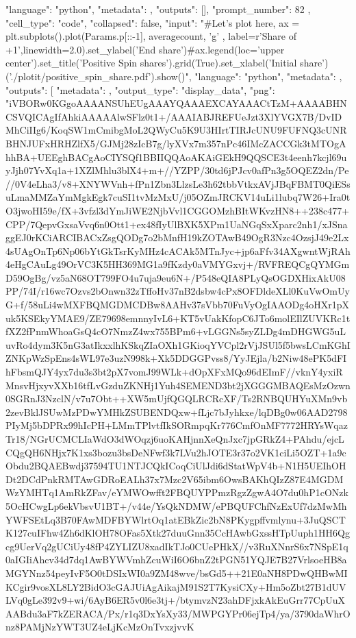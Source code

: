{{{     "language": "python",
     "metadata": {},
     "outputs": [],
     "prompt_number": 82
    },
    {
     "cell_type": "code",
     "collapsed": false,
     "input": "#Let's plot here\nfig, ax = plt.subplots()\nax.plot(Params.p[::-1], averagecount, 'g' , label=r'Share of +1',linewidth=2.0)\nax.set_ylabel('End share')\n\n#ax.legend(loc='upper center')\nax.set_title('Positive Spin shares')\nax.grid(True)\nax.set_xlabel('Initial share')\nsavefig('./plotit/positive_spin_share.pdf')\nplt.show()",
     "language": "python",
     "metadata": {},
     "outputs": [
      {
       "metadata": {},
       "output_type": "display_data",
       "png": "iVBORw0KGgoAAAANSUhEUgAAAYQAAAEXCAYAAACtTzM+AAAABHNCSVQICAgIfAhkiAAAAAlwSFlz\nAAALEgAACxIB0t1+/AAAIABJREFUeJzt3XlYVGX7B/DvIDMhCiIIg6/KoqSW1mCmibgMoL2QWyCu\nuIBUpijmBpap5K9U3HIrtTIRJcUNU9FUFNQ3cUNRBHNJUFxHRHZlfX5/GJMj28zIcB7g/lyXVx7m\ncObrGTo357nPc46IMcZACCGk3tMTOgAhhBA+UEEghBACgAoCIYSQf1BBIIQQAoAKAiGEkH9QQSCE\nEAKACgKpRlFRUbC3t4eenh7kcjl69uyJjh07YvXq1a+1XZlMhlu3blX4+m+//YZPP/30td6jPJcv\nX0afPn3g5OQEZ2dn/Pe//0V4eLha3/v8+XNYWVnh+fPn1Zbn3LlzsLe3h62tbbVtkxAVjJBqFBMT\nw0QiESsuLmaMMZaYmMgkEgk7cuSI1tvMzMxU/j05OZmJRCKV14uLi1lubq7W26+Ira0tO3jwoHI5\nJCSE9e/fX+3vfzl3dYmJiWE2NjbVvl1CGGOMzhBItWKvzHN8++238c477+CPP/7QepvGxsaVvq6n\npwdDQ0Ott1+ex48fIyUlBXK5XPm1UaNGqSxXparc2nh1/xJSnaggEJ0rKCiARCIBACxZsgQODg7o\n2bMnfH19kZOTAwB49OgR3Nzc4OzsjJ49e2Lx4sUAgOnTp6Np06bYtGkTsrKyMHz4cACAk5MTnJyc\ncPnyZZVhFFdXV+jp6aFfv34AXgwntWjRAh4eHgCAuLg49OrVC3K5HH369MG1a9fKzdy0aVMYGxvj+/RVFREQCgQYMGmD59OgBg/vz5aN68OT799FO4u7uja9eu6N+/P548eQIA8PLyQsOGDXHixAkU\nFhZCLpdDT08PP/74I/r16wc7Ozvs2bOnwn32zTffoHv37nB2dsbw4cPx8OFDldeXLl0KuVwOmUyG+f/58uLi4wMXFBQMGDMCDBw8AAHv37sVbb70FuVyOgIAAODg4oHXr1pXuk5KSEkyYMAE9\ne/ZE79698emnnyIvL6+KT5vUakKfopC6JTo6molEIlZUVKRc1tfXZ2fPnmWhoaGsQ4cO7NmzZ4wx\nxj755BPm6+vLGGNs5syZLDg4mDHGWG5uLuvRo4dym3K5nG3atIkxxlhKSkqZIaOXh1GKioqYVCpl\nsbGxytcHDRrEGGMsIyODNWvWjEVHRzPGGIuMjGTt2rVjJSUl5f5bwsLCmKGhIZNKpWzSpEns4sWL\nKq97e3uzN998k+Xk5DDGGPvss8/YyJEjla/b2Niw48ePK5dFIhFbsmQJY4yx7du3s3bt2pX7vomJ\nieztt99WLk+dOpXFxMQo96dEImF//vknY4yxiRMnsvHjxyvXXb16tfLvGzduZKNHj1Yuh4SEMEND\nQ3bt2jXGGGMBAQEsMzOzwn0SGRnJ3NzclN/v7u7Obt++XW5mUjfQGQLRCRcXF/Ts2RNBQUHYuXMn\nunTpgtDQUAwfPhwGBgYAAG9vb2zevBklJSUwMzPDwYMHkZSUBENDQxw+fLjc7bJyhkxe/lqDBg0w\nYsQIhISEAACuXLmCDh06AAD2798PIyMj5bDPRx99hIcPH+LMmTPlvtfIkSORmpqKr776CmfOnMF7\n772HRYsWqazTr18/NGrUCMCLIaWdO3dWOqzj6uoKAHjnnXeQnJxc7jpGRkZ4+PAhdu/ejcLCQgQH\nB6NHjx7K1xs3bozu3bsDeNFwf3k7LVu2hJOTE3r37o2VK1ciLi5OZT+1a9cObdu2BQAEBwdj3759\nFe4TU1NTJCQkICoqCiUlJdi6dStatWpV4b+N1H5UEIhOHDt2DCdPnkRMTAwGDRoEALh37x7Mzc2V\n65ibm6OwsBAKhQIzZ87E4MGDMWzYMHTq1AmRkZFav/eYMWOwfft2FBQUYPPmzRgzZgwA4O7du0hP\nT1cONzk5OcHCwgLp6ekVbsvU1BT+/v44e/YsQkNDMW/ePBQUFChfNzExUf7dzMwMhYWFSEtLq3B7\npX0FAwMDFBYWlrtOq1atEBkZic2bN8PKygpffvmlynu+3JuQSCTK127cuIFhw4Zh6dKlOH78OFas\nWFFmiKdJkyYqy5Xtk27duuGnn35CcHAwbGxssHTpUuph1HH6Qgcg9UerVq2gUCiUy48fP4ZYLIZU\nKsXDhw8xadIkTJo0CUePHkX//v3RuXNnrS6x7NSpE1q0aIGIiAhcv34d7dq1AwBYWVmhZcuWiI6O\nVq6bnZ2tPGN51YQJE7B27VrlsoeHB8aMGYNnz54peyIvF5O0tDSIxWI0a9ZM48wve/bsGd5++21E\nRETg0aNH8PDwQHBwMIKCgir9vosXL8LY2BidO3cGAJUiAgAikajM91S2T7KysiCXy+Hm5oZbt27B\n1dUVLVq0gLe392v9+wi/6AyB6ER5v0l6e3tj+/btymvzN23ahDFjxkAkEuGrr77CpUuXAABdu3aF\nRCJRboMxpvy7kZERACA/Px/r1q3DxYsXy33/MWPGYPr06ejTp4/ya/3790daWhrOnz8PAMjNzYWT\nkxOysrLK3UZ4eLjKcMzOnTvxzjvvK}}}}
